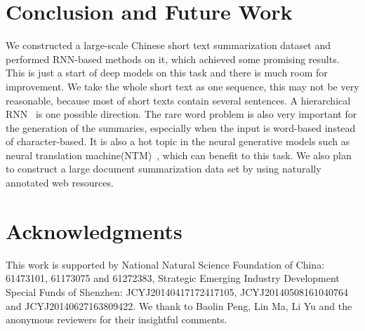 \documentclass[11pt,a4paper]{article}
\begin{document}
\vspace{-2pt}
\section{Conclusion and Future Work}
\vspace{-2pt}
We constructed a large-scale Chinese short text summarization dataset and performed RNN-based methods on it, which achieved some promising results. This is just a start of deep models on this task and there is much room for improvement. We take the whole short text as one sequence, this may not be very reasonable, because most of short texts contain several sentences. A hierarchical RNN~\cite{jiwei} is one possible direction. The rare word problem is also very important for the generation of the summaries, especially when the input is word-based instead of character-based.
It is also a hot topic in the neural generative models  such as neural translation machine(NTM)~\cite{rareword}, which can benefit to this task. We also plan to construct a large document summarization data set by using naturally annotated web resources.


\vspace{-2pt}
\section*{Acknowledgments}
 \vspace{-5pt}
This work is supported by National Natural Science Foundation of China: 61473101, 61173075 and 61272383, Strategic Emerging Industry Development Special Funds of Shenzhen: JCYJ20140417172417105, JCYJ20140508161040764 and JCYJ20140627163809422. We thank to Baolin Peng, Lin Ma, Li Yu and the anonymous reviewers for their insightful comments.

\vspace{-10pt}


\balance

\end{document}
